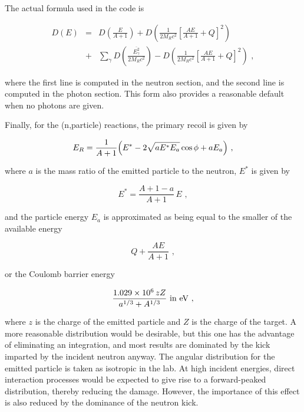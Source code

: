 \noindent
The actual formula used in the code is

\begin{eqnarray}
   D(E)&=&D\left(\frac{E}{A+1}\right)
       +D\left(\frac{1}{2M_Rc^2}\left[\frac{AE}{A+1}
       +Q\right]^2\right) \nonumber\\
       &+&\sum_\gamma D\left(\frac{\overline{E^2_\gamma}}
        {2M_Rc^2}\right)-D\left(\frac{1}{2M_Rc^2}\left[
        \frac{AE}{A+1}+Q\right]^2\right)\,\,,
\label{D102}
\end{eqnarray}

\noindent
where the first line is computed in the neutron section, and
the second line is computed in the photon section.  This form
also provides a reasonable default when no photons are given.

Finally, for the (n,particle) reactions, the primary recoil
is given by

\begin{equation}
   E_R=\frac{1}{A+1}\Bigl(E^*-2\sqrt{aE^*E_a}\cos\phi+aE_a\Bigr)\,\,,
\label{npart}
\end{equation}
\vspace{1 pt}

\noindent
where $a$ is the mass ratio of the emitted particle to the neutron,
$E^*$ is given by

\begin{equation}
   E^*=\frac{A+1-a}{A+1}\,E\,\,,
\end{equation}
\vspace{1 pt}

\noindent
and the particle energy $E_a$ is approximated as being equal
to the smaller of the available energy

\begin{equation}
   Q+\frac{AE}{A+1}\,\,,
\end{equation}
\vspace{1 pt}

\noindent
or the Coulomb barrier energy

\begin{equation}
   \frac{1.029\times10^6\,zZ}{a^{1/3}+A^{1/3}}\,\,
      \hbox{\rm in eV}\,\,,
\end{equation}
\vspace{1 pt}

\noindent
where $z$ is the charge of the emitted particle and $Z$ is
the charge of the target.  A more reasonable distribution would
be desirable\cite{alb}, but this one has the advantage of
eliminating an integration, and most results are dominated by
the kick imparted by the incident neutron anyway.  The angular
distribution for the emitted particle is taken as isotropic
in the lab.  At high incident energies, direct interaction
processes would be expected to give rise to a forward-peaked
distribution, thereby reducing the
damage.  However, the
importance of this effect is also reduced by the dominance
of the neutron kick.

